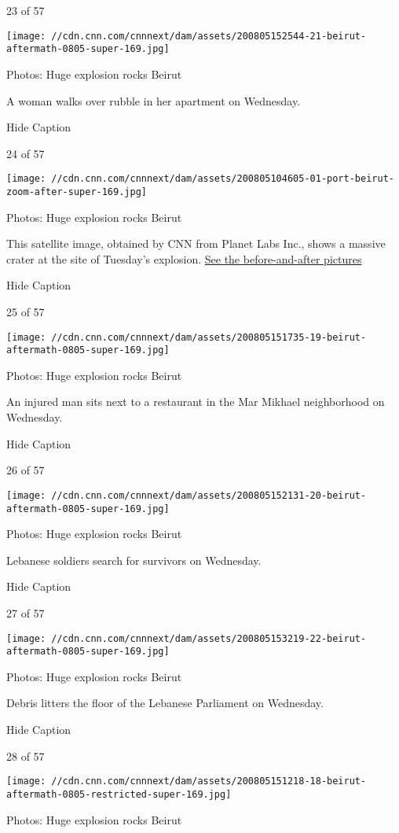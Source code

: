 23 of 57

\texttt{[image: //cdn.cnn.com/cnnnext/dam/assets/200805152544-21-beirut-aftermath-0805-super-169.jpg]}

Photos: Huge explosion rocks Beirut

A woman walks over rubble in her apartment on Wednesday.

Hide Caption

24 of 57

\texttt{[image: //cdn.cnn.com/cnnnext/dam/assets/200805104605-01-port-beirut-zoom-after-super-169.jpg]}

Photos: Huge explosion rocks Beirut

This satellite image, obtained by CNN from Planet Labs Inc., shows a
massive crater at the site of Tuesday's explosion.
\href{https://www.cnn.com/2020/08/05/world/satellite-images-beirut-explosion-before-after-trnd/index.html}{See
the before-and-after pictures}

Hide Caption

25 of 57

\texttt{[image: //cdn.cnn.com/cnnnext/dam/assets/200805151735-19-beirut-aftermath-0805-super-169.jpg]}

Photos: Huge explosion rocks Beirut

An injured man sits next to a restaurant in the Mar Mikhael neighborhood
on Wednesday.

Hide Caption

26 of 57

\texttt{[image: //cdn.cnn.com/cnnnext/dam/assets/200805152131-20-beirut-aftermath-0805-super-169.jpg]}

Photos: Huge explosion rocks Beirut

Lebanese soldiers search for survivors on Wednesday.

Hide Caption

27 of 57

\texttt{[image: //cdn.cnn.com/cnnnext/dam/assets/200805153219-22-beirut-aftermath-0805-super-169.jpg]}

Photos: Huge explosion rocks Beirut

Debris litters the floor of the Lebanese Parliament on Wednesday.

Hide Caption

28 of 57

\texttt{[image: //cdn.cnn.com/cnnnext/dam/assets/200805151218-18-beirut-aftermath-0805-restricted-super-169.jpg]}

Photos: Huge explosion rocks Beirut

